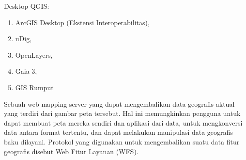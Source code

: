 Desktop QGIS:
\begin{enumerate}
\item ArcGIS Desktop (Ekstensi Interoperabilitas),
\item uDig,
\item OpenLayers,
\item Gaia 3,
\item GIS Rumput
\end{enumerate}

Sebuah web mapping server yang dapat mengembalikan data geografis aktual yang terdiri dari gambar peta tersebut. Hal ini memungkinkan pengguna untuk dapat membuat peta mereka sendiri dan aplikasi dari data, untuk mengkonversi data antara format tertentu, dan dapat melakukan manipulasi data geografis baku dilayani. Protokol yang digunakan untuk mengembalikan suatu data fitur geografis disebut Web Fitur Layanan (WFS)\cite{purab2015penyajian}.
